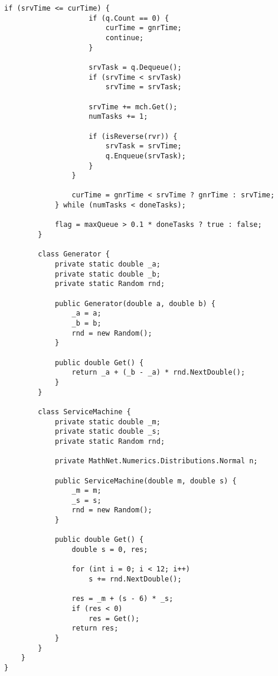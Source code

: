 \begin{lstlisting}[label=code, caption = Основные методы]
				if (srvTime <= curTime) {
					if (q.Count == 0) {
						curTime = gnrTime;
						continue;
					}
					
					srvTask = q.Dequeue();
					if (srvTime < srvTask)
						srvTime = srvTask;
					
					srvTime += mch.Get();
					numTasks += 1;
					
					if (isReverse(rvr)) {
						srvTask = srvTime;
						q.Enqueue(srvTask);
					}
				}
				
				curTime = gnrTime < srvTime ? gnrTime : srvTime;
			} while (numTasks < doneTasks);
			
			flag = maxQueue > 0.1 * doneTasks ? true : false;
		}
		
		class Generator {
			private static double _a;
			private static double _b;
			private static Random rnd;
			
			public Generator(double a, double b) {
				_a = a;
				_b = b;
				rnd = new Random();
			}
			
			public double Get() {
				return _a + (_b - _a) * rnd.NextDouble();
			}
		}
		
		class ServiceMachine {
			private static double _m;
			private static double _s;
			private static Random rnd;
			
			private MathNet.Numerics.Distributions.Normal n;
			
			public ServiceMachine(double m, double s) {
				_m = m;
				_s = s;
				rnd = new Random();
			}
			
			public double Get() {
				double s = 0, res;
				
				for (int i = 0; i < 12; i++)
					s += rnd.NextDouble();
				
				res = _m + (s - 6) * _s;
				if (res < 0)
					res = Get();
				return res;
			}
		}
	}
}
\end{lstlisting}